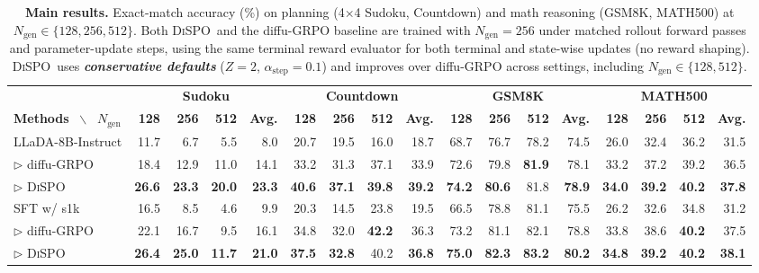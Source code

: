 \documentclass{article}
\newcommand{\method}{{\textsc{DiSPO}}}
\theoremstyle{plain}
\theoremstyle{definition}
\theoremstyle{remark}
\begin{document}
\begin{table}[t]
\centering
\small
\caption{\textbf{Main results.} Exact-match accuracy (\%) on planning (4$\times$4 Sudoku, Countdown) and math reasoning (GSM8K, MATH500) at $N_{\text{gen}}\in\{128,256,512\}$.
Both \method\ and the diffu-GRPO baseline are trained with $N_{\text{gen}}{=}256$ under matched rollout forward passes and parameter-update steps, using the same terminal reward evaluator for both terminal and state-wise updates (no reward shaping).
\method\ uses \emph{\textbf{conservative defaults}} ($Z{=}2$, $\alpha_{\text{step}}{=}0.1$) and improves over diffu-GRPO across settings, including $N_{\text{gen}}\in\{128,512\}$.}
\begin{tabular}{lr@{\,\,\,\,\,}r@{\,\,\,\,\,}r@{\,\,\,\,\,}rr@{\,\,\,\,\,}r@{\,\,\,\,\,}r@{\,\,\,\,\,}rr@{\,\,\,\,\,}r@{\,\,\,\,\,}r@{\,\,\,\,\,}rr@{\,\,\,\,\,}r@{\,\,\,\,\,}r@{\,\,\,\,\,}r}
\toprule
& \multicolumn{4}{c}{\textbf{Sudoku}} & \multicolumn{4}{c}{\textbf{Countdown}} & \multicolumn{4}{c}{\textbf{GSM8K}} & \multicolumn{4}{c}{\textbf{MATH500}} \\
\cmidrule(lr){2-5}\cmidrule(lr){6-9}\cmidrule(lr){10-13}\cmidrule(lr){14-17}
\textbf{Methods} ~$\backslash$~ \textbf{$N_\text{gen}$} & \textbf{128} & \textbf{256} & \textbf{512} & \textbf{Avg.} & \textbf{128} & \textbf{256} & \textbf{512} & \textbf{Avg.} & \textbf{128} & \textbf{256} & \textbf{512} & \textbf{Avg.} & \textbf{128} & \textbf{256} & \textbf{512} & \textbf{Avg.} \\
\midrule
LLaDA-8B-Instruct & 11.7 & 6.7 & 5.5 & 8.0 & 20.7 & 19.5 & 16.0 & 18.7 & 68.7 & 76.7 & 78.2 & 74.5 & 26.0 & 32.4 & 36.2 & 31.5 \\
\quad $\triangleright$ diffu-GRPO & 18.4 & 12.9 & 11.0 & 14.1 & 33.2 & 31.3 & 37.1 & 33.9 & 72.6 & 79.8 & \textbf{81.9} & 78.1 & 33.2 & 37.2 & 39.2 & 36.5 \\
\rowcolor{gray!10}
\quad $\triangleright$ \method\ & \textbf{26.6} & \textbf{23.3} & \textbf{20.0} & \textbf{23.3} & \textbf{40.6} & \textbf{37.1} & \textbf{39.8} & \textbf{39.2} & \textbf{74.2} & \textbf{80.6} & {81.8} & \textbf{78.9} & \textbf{34.0} & \textbf{39.2} & \textbf{40.2} & \textbf{37.8} \\
\midrule
SFT w/ s1k & 16.5 & 8.5 & 4.6 & 9.9 & 20.3 & 14.5 & 23.8 & 19.5 & 66.5 & 78.8 & 81.1 & 75.5 & 26.2 & 32.6 & 34.8 & 31.2 \\
\quad $\triangleright$ diffu-GRPO & 22.1 & 16.7 & 9.5 & 16.1 & 34.8 & 32.0 & \textbf{42.2} & 36.3 & 73.2 & 81.1 & 82.1 & 78.8 & {33.8} & {38.6} & \textbf{40.2} & {37.5} \\
\rowcolor{gray!10}
\quad $\triangleright$ \method & \textbf{26.4} & \textbf{25.0} & \textbf{11.7} & \textbf{21.0} & \textbf{37.5} & \textbf{32.8} & 40.2 & \textbf{36.8} & \textbf{75.0} & \textbf{82.3} & \textbf{83.2} & \textbf{80.2} & \textbf{34.8} & \textbf{39.2} & \textbf{40.2} & \textbf{38.1} \\
\bottomrule
\end{tabular}
\label{tab:main-results}
\end{table}
\end{document}
